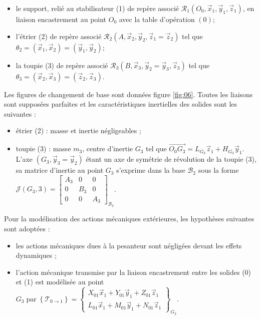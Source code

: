 \begin{itemize}
  \item le support, relié au stabilisateur (1) de repère associé $\mathcal{R}_{1}\left(O_{0}, \vec{x}_{1}, \vec{y}_{1}, \vec{z}_{1}\right)$, en liaison encastrement au point $O_{0}$ avec la table d'opération $(0)$;

  \item l'étrier (2) de repère associé $\mathcal{R}_{2}\left(A, \vec{x}_{2}, \vec{y}_{2}, \vec{z}_{1}=\vec{z}_{2}\right)$ tel que $\theta_{2}=\left(\vec{x}_{1}, \vec{x}_{2}\right)=\left(\vec{y}_{1}, \vec{y}_{2}\right)$;

  \item la toupie (3) de repère associé $\mathcal{R}_{3}\left(B, \vec{x}_{3}, \vec{y}_{2}=\vec{y}_{3}, \vec{z}_{3}\right)$ tel que $\theta_{3}=\left(\vec{x}_{2}, \vec{x}_{3}\right)=\left(\vec{z}_{2}, \vec{z}_{3}\right)$.

\end{itemize}

Les figures de changement de base sont données figure \ref{fig:06}. Toutes les liaisons sont supposées parfaites et les caractéristiques inertielles des solides sont les suivantes :
\begin{itemize}
\item étrier (2) : masse et inertie négligeables ;
\item toupie (3) : masse $m_{3}$, centre d'inertie $G_{3}$ tel que $\overrightarrow{O_{0} G_{3}}=L_{G_{3}} \vec{z}_{1}+H_{G_{3}} \vec{y}_{1}$. L'axe $\left(G_{3}, \vec{y}_{3}=\vec{y}_{2}\right)$ étant un axe de symétrie de révolution de la toupie (3), sa matrice d'inertie au point $G_{3}$ s'exprime dans la base $\mathcal{B}_{2}$ sous la forme $\mathcal{J}\left(G_{3}, 3\right)=\left[\begin{array}{ccc}A_{3} & 0 & 0 \\ 0 & B_{3} & 0 \\ 0 & 0 & A_{3}\end{array}\right]_{\mathcal{B}_{2}}$.
\end{itemize}

Pour la modélisation des actions mécaniques extérieures, les hypothèses suivantes sont adoptées :

\begin{itemize}
  \item les actions mécaniques dues à la pesanteur sont négligées devant les effets dynamiques ;

  \item l'action mécanique transmise par la liaison encastrement entre les solides (0) et (1) est modélisée au point $G_{3} \operatorname{par}\left\{\mathcal{T}_{0 \rightarrow 1}\right\}=\left\{\begin{array}{c}X_{01} \vec{x}_{1}+Y_{01} \vec{y}_{1}+Z_{01} \vec{z}_{1} \\ L_{01} \vec{x}_{1}+M_{01} \vec{y}_{1}+N_{01} \vec{z}_{1}\end{array}\right\}_{G_{3}}$.

\end{itemize}

